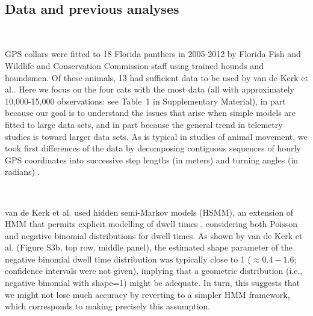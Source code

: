 \documentclass{bmcart}
\begin{document}
\

\subsection*{Data and previous analyses}

\

GPS collars were fitted to 18 Florida panthers in 2005-2012 by Florida
Fish and Wildlife and Conservation Commission staff using
trained hounds and houndsmen. Of these animals, 13 had 
sufficient data to be used by van de Kerk et al.\cite{kerk2015hidden}.
Here we focus on the four cats with the most data (all with approximately 10,000-15,000
observations: see Table~1 in Supplementary Material), 
in part because our goal is to understand
the issues that arise when simple models are fitted to large data sets, and 
in part because the general trend in telemetry studies is toward larger data sets.  
As is typical in studies of animal movement, 
we took first differences of the data by decomposing
contiguous sequences of hourly GPS coordinates into 
successive step lengths (in meters) and turning angles (in radians)
\cite{turchin1998quantitative,kerk2015hidden}.

\

van de Kerk et al.\cite{kerk2015hidden} used hidden semi-Markov models (HSMM), 
an extension of HMM that permits explicit modelling of dwell times 
\cite{langrock_flexible_2012}, considering both Poisson and
negative binomial distributions for dwell times.  As shown 
by van de Kerk et al.\cite{kerk2015hidden} (Figure S3b, top row, middle panel),
the estimated shape parameter of the negative binomial dwell time
distribution was typically close to 1 ($\approx 0.4-1.6$; confidence
intervals were not given), implying that a geometric distribution
(i.e., negative binomial with shape=1) might be adequate. In turn,
this suggests that we might not lose much accuracy by reverting to 
a simpler HMM framework, which corresponds
to making precisely this assumption.

\
\end{document}
